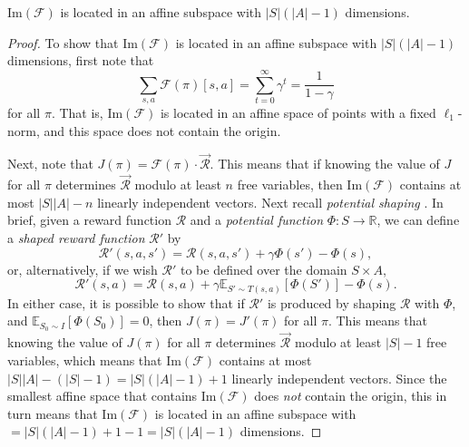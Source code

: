 \begin{proposition}\label{prop:image_dimension}
$\mathrm{Im}(\mathcal{F})$ is located in an affine subspace with $|S|(|A|-1)$ dimensions.
\end{proposition}
\begin{proof}
To show that $\mathrm{Im}(\mathcal{F})$ is located in an affine subspace with $|S|(|A|-1)$ dimensions, first note that
$$
\sum_{s,a} \mathcal{F}(\pi)[s,a] = \sum_{t=0}^\infty \gamma^t = \frac{1}{1-\gamma}
$$
for all $\pi$. That is, $\mathrm{Im}(\mathcal{F})$ is located in an affine space of points with a fixed $\ell_1$-norm, and this space does not contain the origin.

Next, note that $J(\pi) = \mathcal{F}(\pi) \cdot \vec{\mathcal{R}}$. This means that if knowing the value of $J$ for all $\pi$ determines $\vec{\mathcal{R}}$ modulo at least $n$ free variables, then $\mathrm{Im}(\mathcal{F})$ contains at most $|S||A|-n$ linearly independent vectors.
Next recall \emph{potential shaping} \citep{ng1999policy}. In brief, given a reward function $\mathcal{R}$ and a \emph{potential function} $\Phi : S \rightarrow \mathbb{R}$, we can define a \emph{shaped reward function} $\mathcal{R}'$ by
$$
\mathcal{R}'(s,a,s') = \mathcal{R}(s,a,s') + \gamma\Phi(s') - \Phi(s),
$$
or, alternatively, if we wish $\mathcal{R}'$ to be defined over the domain $S \times A$,
$$
\mathcal{R}'(s,a) = \mathcal{R}(s,a) + \gamma \mathbb{E}_{S' \sim T(s,a)}[\Phi(S')] - \Phi(s).
$$
In either case, it is possible to show that if $\mathcal{R}'$ is produced by shaping $\mathcal{R}$ with $\Phi$, and $\mathbb{E}_{S_0 \sim I}\left[\Phi(S_0)\right] = 0$, then $J(\pi) = J'(\pi)$ for all $\pi$. This means that knowing the value of $J(\pi)$ for all $\pi$ determines $\vec{\mathcal{R}}$ modulo at least $|S|-1$ free variables, which means that $\mathrm{Im}(\mathcal{F})$ contains at most $|S||A| - (|S| - 1) = |S|(|A|-1) + 1$ linearly independent vectors. Since the smallest affine space that contains $\mathrm{Im}(\mathcal{F})$ does \emph{not} contain the origin, this in turn means that $\mathrm{Im}(\mathcal{F})$ is located in an affine subspace with $= |S|(|A|-1) + 1 - 1 = |S|(|A|-1)$ dimensions.
\end{proof}

